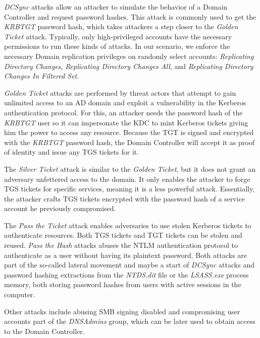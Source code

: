 \textit{DCSync} attacks allow an attacker to simulate the behavior of a Domain Controller and request password hashes. This attack is commonly used to get the \textit{KRBTGT} password hash, which takes attackers a step closer to the \textit{Golden Ticket} attack. Typically, only high-privileged accounts have the necessary permissions to run these kinds of attacks. In our scenario, we enforce the necessary Domain replication privileges on randomly select accounts: \textit{Replicating Directory Changes}, \textit{Replicating Directory Changes All}, and \textit{Replicating Directory Changes In Filtered Set}.

\textit{Golden Ticket} attacks are performed by threat actors that attempt to gain unlimited access to an AD domain and exploit a vulnerability in the Kerberos authentication protocol. For this, an attacker needs the password hash of the \textit{KRBTGT} user so it can impersonate the KDC to mint Kerberos tickets giving him the power to access any resource. Because the TGT is signed and encrypted with the \textit{KRBTGT} password hash, the Domain Controller will accept it as proof of identity and issue any TGS tickets for it.


The \textit{Silver Ticket} attack is similar to the \textit{Golden Ticket}, but it does not grant an adversary unfettered access to the domain. It only enables the attacker to forge TGS tickets for specific services, meaning it is a less powerful attack. Essentially, the attacker crafts TGS tickets encrypted with the password hash of a service account he previously compromised.

The \textit{Pass the Ticket} attack enables adversaries to use stolen Kerberos tickets to authenticate resources. Both TGS tickets and TGT tickets can be stolen and reused. \textit{Pass the Hash} attacks abuses the NTLM authentication protocol to authenticate as a user without having its plaintext password. Both attacks are part of the so-called lateral movement and maybe a start of \textit{DCSync} attacks and password hashing extractions from the \textit{NTDS.dit} file or the \textit{LSASS.exe} process memory, both storing password hashes from users with active sessions in the computer.

Other attacks include abusing SMB signing disabled and compromising user accounts part of the \textit{DNSAdmins} group, which can be later used to obtain access to the Domain Controller.


